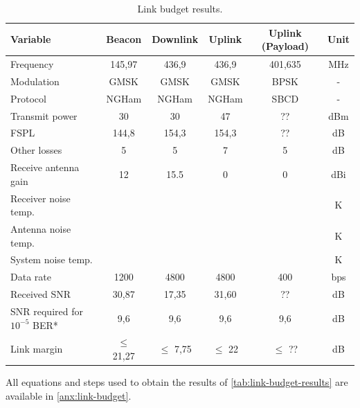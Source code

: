 \begin{table}[!h]
    \centering
    \begin{tabular}{L{0.3\textwidth}ccccc}
        \toprule[1.5pt]
        \textbf{Variable} & \textbf{Beacon} & \textbf{Downlink} & \textbf{Uplink} & \textbf{Uplink (Payload)} & \textbf{Unit}\\
        \midrule
        Frequency                       & 145,97    & 436,9     & 436,9     & 401,635   & MHz \\
        Modulation                      & GMSK      & GMSK      & GMSK      & BPSK      & - \\
        Protocol                        & NGHam     & NGHam     & NGHam     & SBCD      & - \\
        Transmit power                  & 30        & 30        & 47        & ??        & dBm \\
        FSPL                            & 144,8     & 154,3     & 154,3     & ??        & dB \\
        Other losses                    & 5         & 5         & 7         & 5         & dB \\
        Receive antenna gain            & 12        & 15.5      & 0         & 0         & dBi \\
        Receiver noise temp.            &           &           &           &           & K \\
        Antenna noise temp.             &           &           &           &           & K \\
        System noise temp.              &           &           &           &           & K \\
        Data rate                       & 1200      & 4800      & 4800      & 400       & bps \\
        Received SNR                    & 30,87     & 17,35     & 31,60     & ??        & dB \\
        SNR required for $10^{-5}$ BER*  & 9,6       & 9,6       & 9,6       & 9,6       & dB \\
        Link margin                     & $\leq$ 21,27 & $\leq$ 7,75 & $\leq$ 22 & $\leq$ ?? & dB \\
        \bottomrule[1.5pt]
    \end{tabular}
    \caption{Link budget results.}
    \label{tab:link-budget-results}
\end{table}

All equations and steps used to obtain the results of \autoref{tab:link-budget-results} are available in \autoref{anx:link-budget}.

